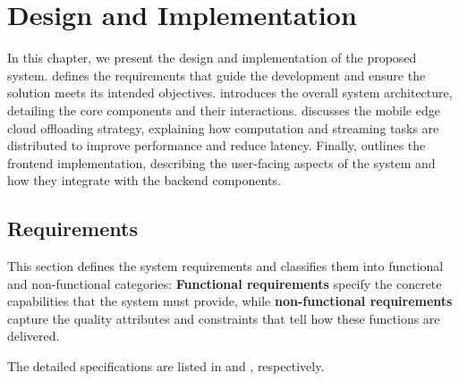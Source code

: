 

\chapter{Design and Implementation}
\label{Design and Implementation}


\quad In this chapter, we present the design and implementation of the proposed system. \textbf{} defines the requirements that guide the development and ensure the solution meets its intended objectives. \textbf{} introduces the overall system architecture, detailing the core components and their interactions. \textbf{} discusses the mobile edge cloud offloading strategy, explaining how computation and streaming tasks are distributed to improve performance and reduce latency. Finally, \textbf{} outlines the frontend implementation, describing the user-facing aspects of the system and how they integrate with the backend components.

\section{Requirements}
\label{sec:requirements}

\quad This section defines the system requirements and classifies them into functional and non-functional categories: \textbf{Functional requirements} specify the concrete capabilities that the system must provide, while \textbf{non-functional requirements} capture the quality attributes and constraints that tell how these functions are delivered. 

\quad The detailed specifications are listed in \textbf{} and \textbf{}, respectively.



